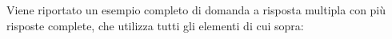 Viene riportato un esempio completo di domanda a risposta multipla con più risposte complete, che utilizza tutti gli elementi di cui sopra:
\newline

\noindent
{}
\newpage